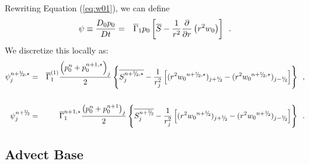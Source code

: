 Rewriting Equation (\ref{eq:w01}), we can define
\begin{eqnarray}
\psi \equiv \frac{D_0 p_0}{Dt} &=& \overline{\Gamma}_1 p_0 \left [ \overline{S} - 
       \frac{1}{r^2} \frac{\partial}{\partial r} \left (r^2 w_0 \right ) \right] \enskip .
\end{eqnarray}
We discretize this locally as:
\begin{eqnarray}
\psi_j^{\nph,\star} &=& \gammabar^{(1)} \frac{\left( p_0^{n} + p_0^{n+1,\star} \right)_j}{2}
\left \{ \overline{S^{\nph,\star}_j} - 
 \frac{1}{r_j^2} \left [ (r^2 {w_0}^{\nph,\star})_{j+\myhalf} -
          (r^2 {w_0}^{\nph,\star})_{j-\myhalf} \right ] \right \} \enskip , \nonumber \\
&& \\
\psi_j^{\nph} &=& \gammabar^{n+1,\star} \frac{\left( p_0^{n} + p_0^{n+1} \right)_j}{2}
\left \{ \overline{S^{\nph}_j} - 
 \frac{1}{r_j^2} \left [ (r^2 {w_0}^{\nph})_{j+\myhalf} -
          (r^2 {w_0}^{\nph})_{j-\myhalf} \right ] \right \} \enskip .
\end{eqnarray}

\subsection{{\bf Advect Base}}\label{Sec:Advect Base Spherical}

